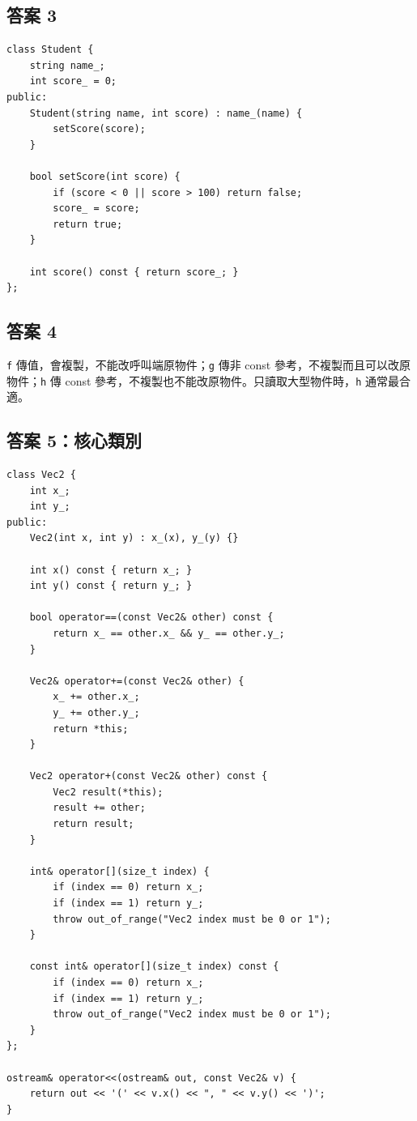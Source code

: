 \documentclass[11pt,a4paper]{article}
\newcommand{\code}[1]{\texttt{#1}}
\begin{document}
\subsection*{答案 3}
\begin{lstlisting}
class Student {
    string name_;
    int score_ = 0;
public:
    Student(string name, int score) : name_(name) {
        setScore(score);
    }

    bool setScore(int score) {
        if (score < 0 || score > 100) return false;
        score_ = score;
        return true;
    }

    int score() const { return score_; }
};
\end{lstlisting}

\subsection*{答案 4}
\code{f} 傳值，會複製，不能改呼叫端原物件；\code{g} 傳非 const 參考，不複製而且可以改原物件；\code{h} 傳 const 參考，不複製也不能改原物件。只讀取大型物件時，\code{h} 通常最合適。

\subsection*{答案 5：核心類別}
\begin{lstlisting}
class Vec2 {
    int x_;
    int y_;
public:
    Vec2(int x, int y) : x_(x), y_(y) {}

    int x() const { return x_; }
    int y() const { return y_; }

    bool operator==(const Vec2& other) const {
        return x_ == other.x_ && y_ == other.y_;
    }

    Vec2& operator+=(const Vec2& other) {
        x_ += other.x_;
        y_ += other.y_;
        return *this;
    }

    Vec2 operator+(const Vec2& other) const {
        Vec2 result(*this);
        result += other;
        return result;
    }

    int& operator[](size_t index) {
        if (index == 0) return x_;
        if (index == 1) return y_;
        throw out_of_range("Vec2 index must be 0 or 1");
    }

    const int& operator[](size_t index) const {
        if (index == 0) return x_;
        if (index == 1) return y_;
        throw out_of_range("Vec2 index must be 0 or 1");
    }
};

ostream& operator<<(ostream& out, const Vec2& v) {
    return out << '(' << v.x() << ", " << v.y() << ')';
}
\end{lstlisting}
\end{document}
